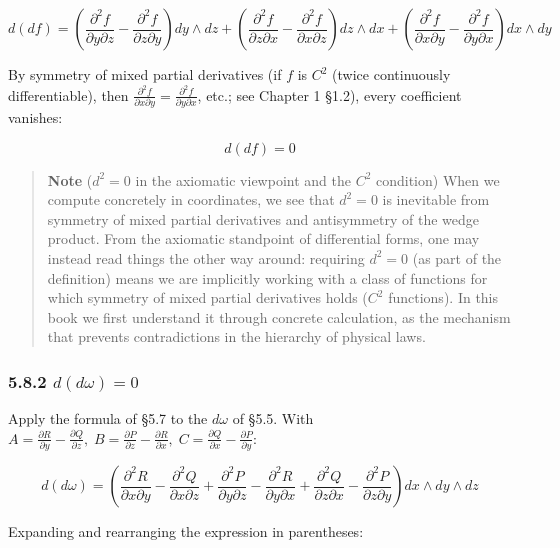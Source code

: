 \documentclass[a4paper,12pt,openany]{book}
\begin{document}
\[d(df) = \left(\frac{\partial^2 f}{\partial y \partial z} - \frac{\partial^2 f}{\partial z \partial y}\right) dy \wedge dz + \left(\frac{\partial^2 f}{\partial z \partial x} - \frac{\partial^2 f}{\partial x \partial z}\right) dz \wedge dx + \left(\frac{\partial^2 f}{\partial x \partial y} - \frac{\partial^2 f}{\partial y \partial x}\right) dx \wedge dy\]

By symmetry of mixed partial derivatives (if \(f\) is \(C^2\) (twice
continuously differentiable), then
\(\frac{\partial^2 f}{\partial x \partial y} = \frac{\partial^2 f}{\partial y \partial x}\),
etc.; see Chapter 1 §1.2), every coefficient vanishes:

\[d(df) = 0\]

\begin{quote}
\textbf{Note} (\(d^2=0\) in the axiomatic viewpoint and the \(C^2\)
condition) When we compute concretely in coordinates, we see that
\(d^2=0\) is inevitable from symmetry of mixed partial derivatives and
antisymmetry of the wedge product. From the axiomatic standpoint of
differential forms, one may instead read things the other way around:
requiring \(d^2=0\) (as part of the definition) means we are implicitly
working with a class of functions for which symmetry of mixed partial
derivatives holds (\(C^2\) functions). In this book we first understand
it through concrete calculation, as the mechanism that prevents
contradictions in the hierarchy of physical laws.
\end{quote}

\hypertarget{ddomega-0}{%
\subsubsection{\texorpdfstring{5.8.2
\(d(d\omega) = 0\)}{5.8.2 d(d\textbackslash omega) = 0}}\label{ddomega-0}}

Apply the formula of §5.7 to the \(d\omega\) of §5.5. With
\(A = \frac{\partial R}{\partial y} - \frac{\partial Q}{\partial z},\; B = \frac{\partial P}{\partial z} - \frac{\partial R}{\partial x},\; C = \frac{\partial Q}{\partial x} - \frac{\partial P}{\partial y}\):

\[d(d\omega) = \left(\frac{\partial^2 R}{\partial x \partial y} - \frac{\partial^2 Q}{\partial x \partial z} + \frac{\partial^2 P}{\partial y \partial z} - \frac{\partial^2 R}{\partial y \partial x} + \frac{\partial^2 Q}{\partial z \partial x} - \frac{\partial^2 P}{\partial z \partial y}\right) dx \wedge dy \wedge dz\]

Expanding and rearranging the expression in parentheses:
\end{document}
